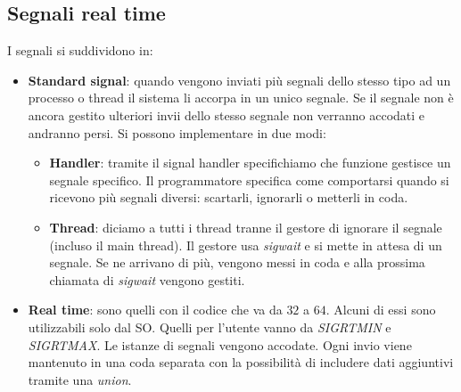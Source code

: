 \subsection{Segnali real time}
I segnali si suddividono in:
\begin{itemize}
	\item \textbf{Standard signal}: quando vengono inviati più segnali dello stesso tipo ad un processo o thread il sistema li accorpa in un unico segnale. Se il segnale non è ancora gestito ulteriori invii dello stesso segnale non verranno accodati e andranno persi. Si possono implementare in due modi:
	\begin{itemize}
		\item \textbf{Handler}: tramite il signal handler specifichiamo che funzione gestisce un segnale specifico. Il programmatore specifica come comportarsi quando si ricevono più segnali diversi: scartarli, ignorarli o metterli in coda.
		\item \textbf{Thread}: diciamo a tutti i thread tranne il gestore di ignorare il segnale (incluso il main thread). Il gestore usa \textit{sigwait} e si mette in attesa di un segnale. Se ne arrivano di più, vengono messi in coda e alla prossima chiamata di \textit{sigwait} vengono gestiti.
	\end{itemize}
	\item \textbf{Real time}: sono quelli con il codice che va da $32$ a $64$. Alcuni di essi sono utilizzabili solo dal SO. Quelli per l'utente vanno da \textit{SIGRTMIN} e \textit{SIGRTMAX}. Le istanze di segnali vengono accodate. Ogni invio viene mantenuto in una coda separata con la possibilità di includere dati aggiuntivi tramite una \textit{union}.
\end{itemize}


